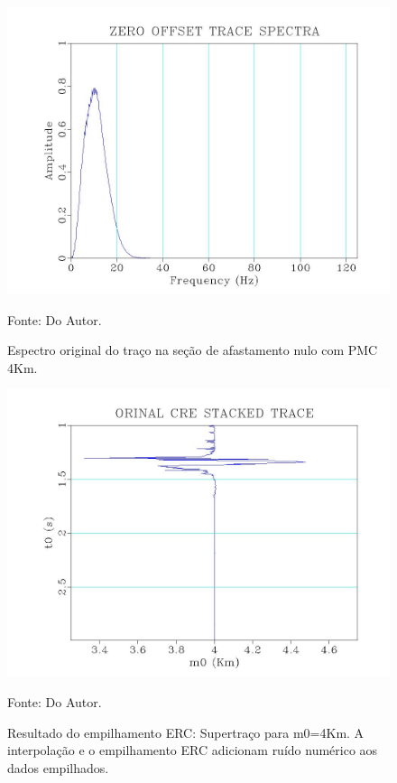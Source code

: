 \begin{figure}
\caption{Espectro original do traço na seção de afastamento nulo com PMC 4Km.}
\begin{center}
\includegraphics[scale=0.4]{images/originalTraceSpectra.jpeg}
\vspace{-0.3cm}
\end{center}
\begin{center}
 Fonte: Do Autor.
\end{center}
\label{fig:7.1}
\end{figure}


\begin{figure}
\caption{Resultado do empilhamento ERC: Supertraço para m0=4Km. A interpolação e o empilhamento ERC adicionam
ruído numérico aos dados empilhados.}
\begin{center}
\includegraphics[scale=0.4]{images/creStackedSection.jpeg}
\vspace{-0.3cm}
\end{center}
\begin{center}
 Fonte: Do Autor.
\end{center}
\label{fig:7.2}
\end{figure}

